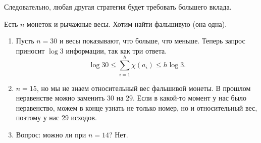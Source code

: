 Следовательно, любая другая стратегия будет требовать большего вклада.


\begin{prac}
	Есть $ n$ монеток и рычажные весы. Хотим найти фальшивую (она одна). 
\begin{enumerate}
    \item Пусть $ n = 30$ и весы показывают, что больше, что меньше. Теперь запрос приносит $  \log 3$ информации, так как три ответа.
		\[
			\log 30 \le  \sum_{i=1}^{h} \chi(a_i) \le h \log 3 
		.\] 
	\item $ n = 15$, но мы не знаем относительный вес фальшивой монеты. В прошлом неравенстве можно заменить  $ 30$ на $ 29$. Если в какой-то момент у нас было неравенство, можем в конце узнать не только номер, но и относительный вес, поэтому у нас $ 29$ исходов.
	\item Вопрос: можно ли при $ n=14$?  Нет. 
\end{enumerate} 
\end{prac}
